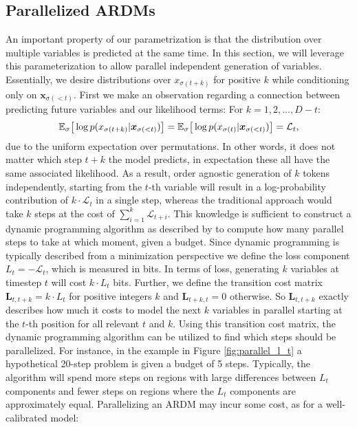 \documentclass{article} \usepackage{iclr2022_conference,times}
\def\vx{{\bm{x}}}
\begin{document}
\subsection{Parallelized ARDMs}
An important property of our parametrization is that the distribution over multiple variables is predicted at the same time. In this section, we will leverage this parameterization to allow parallel independent generation of variables. Essentially, we desire distributions over $x_{\sigma(t+k)}$ for positive $k$ while conditioning only on $\vx_{\sigma(<t)}$. First we make an observation regarding a connection between predicting future variables and our likelihood terms: For $k = 1, 2, \ldots, D - t$:
\begin{equation} \small
\mathbb{E}_{\sigma} \big{[}\log p(x_{\sigma(t + k)} | \vx_{\sigma(<t)}) \big{]} = \mathbb{E}_{\sigma} \big{[}\log p(x_{\sigma(t)} | \vx_{\sigma(<t)}) \big{]} =  \mathcal{L}_t,
\end{equation}
due to the uniform expectation over permutations. In other words, it does not matter which step $t+k$ the model predicts, in expectation these all have the same associated likelihood. As a result, order agnostic generation of $k$ tokens independently, starting from the $t$-th variable will result in a log-probability contribution of $k \cdot\mathcal{L}_t$ in a single step, whereas the traditional approach would take $k$ steps at the cost of $\sum_{i=1}^k \mathcal{L}_{t+i}$. 
This knowledge is sufficient to construct a dynamic programming algorithm as described by \citet{watson2021learningefficientlysample} to compute how many parallel steps to take at which moment, given a budget. Since dynamic programming is typically described from a minimization perspective we define the loss component $L_t = -\mathcal{L}_t$, which is measured in bits. In terms of loss, generating $k$ variables at timestep $t$ will cost $k \cdot L_t$ bits. Further, we define the transition cost matrix $\mathbf{L}_{t,t+k} = k \cdot L_t$ for positive integers $k$ and $\mathbf{L}_{t+k,t} = 0 $ otherwise. So $\mathbf{L}_{t,t+k}$ exactly describes how much it costs to model the next $k$ variables in parallel starting at the $t$-th position for all relevant $t$ and $k$. Using this transition cost matrix, the dynamic programming algorithm can be utilized to find which steps should be parallelized. For instance, in the example in Figure \ref{fig:parallel_l_t} a hypothetical 20-step problem is given a budget of 5 steps. Typically, the algorithm will spend more steps on regions with large differences between $L_t$ components and fewer steps on regions where the $L_t$ components are approximately equal. Parallelizing an ARDM may incur some cost, as for a well-calibrated model:
\end{document}
